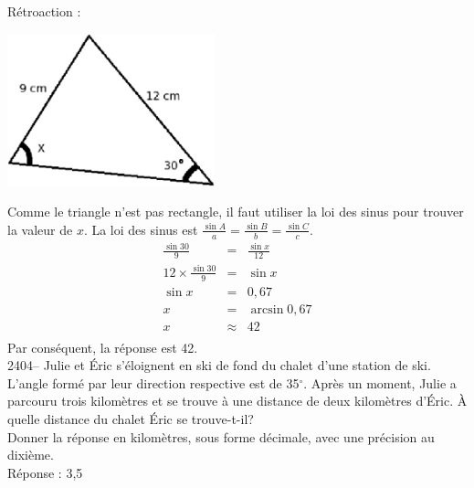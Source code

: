 \documentclass[letterpaper, 12pt]{article}
\begin{document}
R\'etroaction :\\
\begin{center}
 \includegraphics[width=6cm,bb=14 14 688 582]{Q2402.eps}
\end{center}
Comme le triangle n'est pas rectangle, il faut utiliser la loi des sinus pour trouver la valeur de $x$. La loi des sinus est $\frac{\sin{A}}{a}=\frac{\sin{B}}{b}=\frac{\sin{C}}{c}$.
\begin{eqnarray*}
 \frac{\sin{30}}{9}&=&\frac{\sin{x}}{12}\\[2mm]
 12 \times \frac{\sin{30}}{9}&=&\sin{x}\\[2mm]
 \sin{x} &=& 0,67\\
 x &=& \arcsin{0,67}\\
 x &\approx& 42\\
\end{eqnarray*}
Par cons\'equent, la r\'eponse est 42.\\

2404-- Julie et \'Eric s'\'eloignent en ski de fond du chalet d'une station de ski. L'angle form\'e par leur direction respective est de 35$^{\circ}$. Apr\`es un moment, Julie a parcouru trois kilom\`etres et se trouve \`a une distance de deux kilom\`etres d'\'Eric. \`A quelle distance du chalet \'Eric se trouve-t-il? \\
Donner la r\'eponse en kilom\`etres, sous forme d\'ecimale, avec une pr\'ecision au dixi\`eme.\\

R\'eponse : 3,5\\
\end{document}
